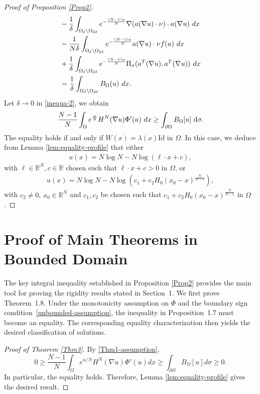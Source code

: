 \documentclass[10pt,a4paper]{amsart}
\numberwithin{equation}{section}
\newcommand{\pa}{\partial}
\newcommand{\R}{\mathbb{R}}
\newcommand{\e}{\textup{e}}
\newcommand{\dx}{\textup{d}x}
\begin{document}
\begin{proof}[Proof of Proposition \ref{Prop2}]
\begin{align}
        &  -\frac{1}{\delta} \int_{\Omega_{\delta} \backslash \Omega_{2\delta}} \e^{-\frac{(N-1)u}{N}} \nabla (a(\nabla u) \cdot \nu) \cdot a(\nabla u) \ \dx  \nonumber\\
        &  -\frac{1}{N\delta} \int_{\Omega_{\delta} \backslash \Omega_{2\delta}} \e^{-\frac{(N-1)u}{N}}  a(\nabla u) \cdot \nu f(u)  \ \dx  \\
        &   + \frac{1}{\delta} \int_{\Omega_{\delta} \backslash \Omega_{2\delta}} \e^{-\frac{(N-1)u}{N}} \Pi_x( a^T(\nabla u),a^T(\nabla u) ) \ \dx  \nonumber \\
        & = \frac{1}{\delta} \int_{\Omega_{\delta} \backslash \Omega_{2\delta}} B_{\Omega}(u) \ \dx. \nonumber
    \end{align}
    Let $\delta \to 0$ in \eqref{inequa-2}, we obtain
    \begin{align*}
        \frac{N-1}{N} \int_{\Omega} \e^{\frac{u}{N}} H^N(\nabla u) \Phi'(u) \ \dx \geq \int_{\pa \Omega} B_{\Omega}[u] \ \text{d} \sigma.
    \end{align*}
    The equality holds if and only if $W(x) = \lambda(x) \text{Id}$ in $\Omega$. In this case, we deduce from Lemma \ref{lem:equality-profile} that either
    \begin{align*}
        u(x) = N \log N - N \log (\ell \cdot x + c),
    \end{align*}
    with $\ell \in \R^N, c \in \R$ chosen such that $\ell \cdot x + c > 0 $ in $\Omega$, or
    \begin{align*}
        u(x) = N \log N - N \log (c_1 + c_2 H_0(x_0-x)^{\frac{N}{N-1}}),
    \end{align*}
    with $c_2 \neq 0$, $x_0 \in \R^N$ and $c_1, c_2$ be chosen such that $c_1 + c_2 H_0(x_0-x)^{\frac{N}{N-1}} $ in $\Omega$.
\end{proof}



\section{Proof of Main Theorems in Bounded Domain}\label{sec:sufficient}

The key integral inequality established in Proposition \ref{Prop2} provides the main tool for proving the rigidity results stated in Section~1. We first prove Theorem~1.8. Under the monotonicity assumption on $\Phi$ and the boundary sign condition~\eqref{unbounded-assumption}, the inequality in Proposition~1.7 must become an equality. The corresponding equality characterization then yields the desired classification of solutions.
\begin{proof}[Proof of Theorem \ref{Thm3}]
By \eqref{Thm1-assumption},
\[
       0 \geq \frac{N-1}{N}\int_\Omega e^{u/N}H^N(\nabla u)\Phi'(u)dx \geq \int_{\partial\Omega}B_\Omega[u]d\sigma\ge0 .
\]
In particular, the equality  holds. Therefore, Lemma \ref{lem:equality-profile} gives the desired result.
\end{proof}
\end{document}
